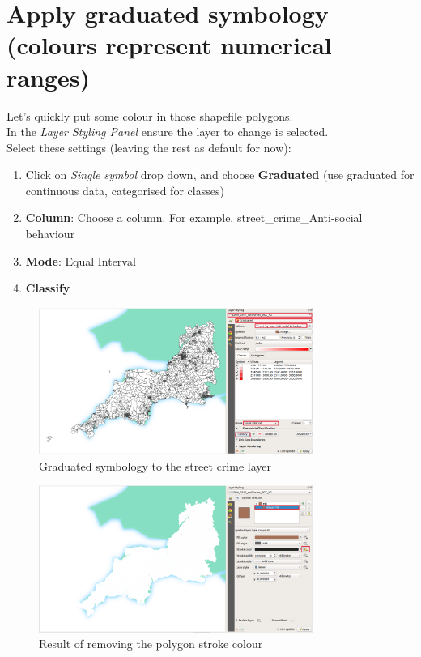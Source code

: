 \section{Apply graduated symbology (colours represent numerical ranges)}

Let's quickly put some colour in those shapefile polygons.\\

In the \textit{Layer Styling Panel} ensure the layer to change is selected.\\

Select these settings (leaving the rest as default for now):
\begin{enumerate}[~~~1)]
	\item
Click on \textit{Single symbol} drop down, and choose \textbf{Graduated} (use graduated for continuous data, categorised for classes)
	\item
\textbf{Column}: Choose a column. For example, street\_crime\_Anti-social behaviour
	\item
\textbf{Mode}: Equal Interval
\item
\textbf{Classify}
\end{enumerate}

\null\newpage

\begin{figure}[!h]
	\centering
	\includegraphics[width=0.8\textwidth]{images/street_crime_graduated1.png}%
	\caption{Graduated symbology to the street crime layer}
	\label{ft_fig_firstfig3}
\end{figure}

\begin{figure}[!h]
	\centering
	\includegraphics[width=0.8\textwidth]{images/street_crime_stroke_colour.png}%
	\caption{Result of removing the polygon stroke colour}
	\label{ft_fig_firstfig3}
\end{figure}

